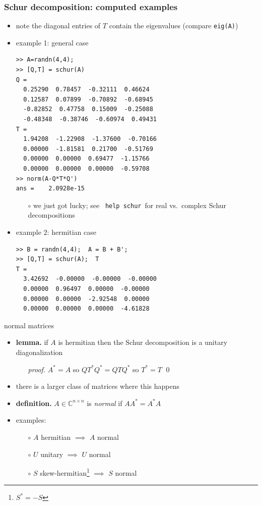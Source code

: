 \documentclass[10pt,hyperref]{beamer}
\newcommand{\CC}{\mathbb{C}}
\newcommand{\bqed}{{\color{blue}\qed}}
\begin{document}
\begin{frame}[fragile]
\frametitle{Schur decomposition: computed examples}

\begin{itemize}
\item note the diagonal entries of $T$ contain the eigenvalues (compare \texttt{eig(A)})
\item example 1: general case
\begin{Verbatim}[fontsize=\scriptsize]
>> A=randn(4,4);
>> [Q,T] = schur(A)
Q =
  0.25290  0.78457  -0.32111  0.46624
  0.12587  0.07899  -0.70892  -0.68945
  -0.82852  0.47758  0.15009  -0.25088
  -0.48348  -0.38746  -0.60974  0.49431
T =
  1.94208  -1.22908  -1.37600  -0.70166
  0.00000  -1.81581  0.21700  -0.51769
  0.00000  0.00000  0.69477  -1.15766
  0.00000  0.00000  0.00000  -0.59708
>> norm(A-Q*T*Q')
ans =    2.0928e-15
\end{Verbatim}
    \begin{itemize}
    \footnotesize
    \item[$\circ$] we just got lucky; see \, \texttt{help schur}\, for real vs.~complex Schur decompositions
    \end{itemize}
\item example 2: hermitian case
\begin{Verbatim}[fontsize=\scriptsize]
>> B = randn(4,4);  A = B + B';
>> [Q,T] = schur(A);  T
T =
  3.42692  -0.00000  -0.00000  -0.00000
  0.00000  0.96497  0.00000  -0.00000
  0.00000  0.00000  -2.92548  0.00000
  0.00000  0.00000  0.00000  -4.61828
\end{Verbatim}
\end{itemize}
\end{frame}


\begin{frame}{normal matrices}

\begin{itemize}
\item \textbf{lemma.} if $A$ is hermitian then the Schur decomposition is a unitary diagonalization
    \begin{itemize}
    \item[\emph{proof.}] $A^* = A$ so $Q T^* Q^* = Q T Q^*$ so $T^*=T$ \bqed
    \end{itemize}
\item there is a larger class of matrices where this happens
\item \textbf{definition.} $A\in \CC^{n\times n}$ is \emph{normal} if $AA^*=A^*A$
\item examples:
    \begin{itemize}
    \item[$\circ$] $A$ hermitian $\implies$ $A$ normal
    \item[$\circ$] $U$ unitary $\implies$ $U$ normal
    \item[$\circ$] $S$ skew-hermitian\footnote{\scriptsize $S^*=-S$} $\implies$ $S$ normal
    \end{itemize}
\end{itemize}
\end{frame}
\end{document}
